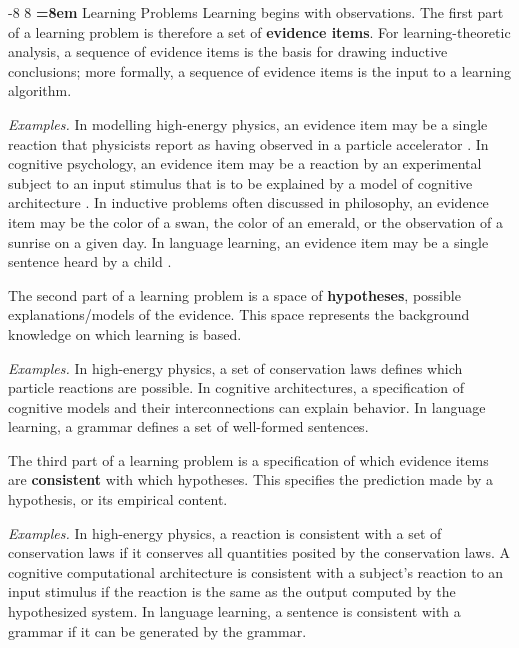 \documentclass{elsarticle}%
\makeatletter
\renewcommand\subsection{\@startsection {subsection}{1}{\z@}%
  {-8\p@ \@plus -4\p@ \@minus -4\p@}%
                       {8\p@ \@plus 4\p@ \@minus 4\p@}%
                                   {\normalfont\large\bfseries\boldmath
                                   \rightskip=\z@ \@plus 8em\pretolerance=10000 }}
\makeatother
\begin{document}
\subsection{Learning Problems}
\label{sec:general-def}
Learning begins with observations. The first part of a learning problem is therefore a set of \textbf{evidence items}. 
%
%
For learning-theoretic analysis, a sequence of evidence items is the basis for drawing inductive conclusions; more formally, a sequence of evidence items is the input to a learning algorithm. 

{\em Examples.} In modelling high-energy physics, an evidence item may be a single reaction that physicists report as having observed in a particle accelerator \cite{Schulte08b}. In cognitive psychology, an evidence item may be a reaction by an experimental subject to an input stimulus that is to be explained by a model of cognitive architecture \cite{glymour94:_method_cognit_neurop}. In inductive problems often discussed in philosophy, an evidence item may be the color of a swan, the color of an emerald, or the observation of a sunrise on a given day. In language learning, an evidence item may be a single sentence heard by a child \cite{gold67limit}.

The second part of a learning problem is a space of \textbf{hypotheses}, possible explanations/models of the evidence. This space represents the background knowledge on which learning is based. 

{\em Examples.} In high-energy physics, a set of conservation laws defines which particle reactions are possible. In cognitive architectures, a specification of cognitive models and their interconnections can explain behavior. In language learning, a grammar defines a set of well-formed sentences. 

The third part of a learning problem is a specification of which evidence items are \textbf{consistent} with which hypotheses. This specifies the prediction made by a hypothesis, or its empirical content. 

{\em Examples.} In high-energy physics, a reaction is consistent with a set of conservation laws if it conserves all quantities posited by the conservation laws. A cognitive computational architecture is consistent with a subject's reaction to an input stimulus if the reaction is the same as the output computed by the hypothesized system. In language learning, a sentence is consistent with a grammar if it can be generated by the grammar.
\end{document}
